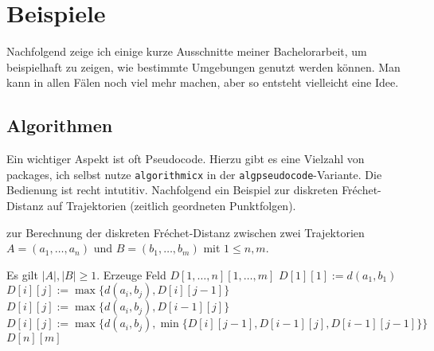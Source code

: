 \chapter{Beispiele}
Nachfolgend zeige ich einige kurze Ausschnitte meiner Bachelorarbeit, um beispielhaft zu zeigen, wie bestimmte Umgebungen genutzt werden können. Man kann in allen Fälen noch viel mehr machen, aber so entsteht vielleicht eine Idee. 

\section{Algorithmen}
Ein wichtiger Aspekt ist oft Pseudocode. Hierzu gibt es eine Vielzahl von packages, ich selbst nutze \texttt{algorithmicx} in der \texttt{algpseudocode}-Variante. Die Bedienung ist recht intutitiv. Nachfolgend ein Beispiel zur diskreten Fréchet-Distanz auf Trajektorien (zeitlich geordneten Punktfolgen).
\begin{algorithm}
	\caption{zur Berechnung der diskreten Fréchet-Distanz zwischen zwei Trajektorien $A=(a_1,\dots,a_n)$ und $B=(b_1,\dots,b_m)$ mit $1\leq n,m$.}
	\label{alg:dfrechet}
	\begin{algorithmic}[1] %
		\Require Es gilt $|A|,|B| \geq 1$.
		\State Erzeuge Feld $D[1,\dots, n][1,\dots, m]$
		\State $D[1][1]:=d(a_1,b_1)$ 	
		 
		\State $D[i][j]:=\max\{d(a_i,b_j),D[i][j-1]\}$
		 
		\State $D[i][j]:=\max\{d(a_i,b_j),D[i-1][j]\}$
		\Else {}
		\State $D[i][j]:=\max\{d(a_i,b_j),\min\{D[i][j-1],D[i-1][j],D[i-1][j-1]\}\}$
		\EndIf 
		\EndFor 
		\EndFor
		\State 	\Return $D[n][m]$ 
		\EndFunction 
	\end{algorithmic}
\end{algorithm}

